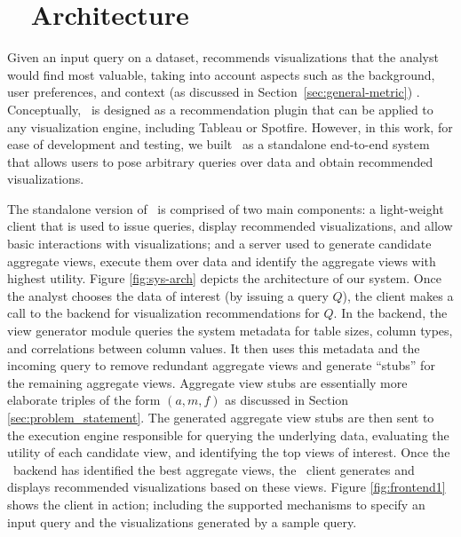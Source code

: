 

\section{{\large \SeeDB\ } Architecture}
\label{sec:system_architecture}

Given an input query on a dataset, 
\SeeDB recommends visualizations that the analyst would find most valuable,
taking into account aspects such as the background, user preferences,
and context (as discussed in Section~\ref{sec:general-metric}) .
Conceptually, \SeeDB\ is designed as a recommendation plugin that can
be applied to any visualization engine,
including Tableau or Spotfire. 
However, in this work, for ease of development and testing, we built 
\SeeDB\ as a standalone end-to-end system that allows users to pose 
arbitrary queries over data and obtain recommended visualizations.

The standalone version of \SeeDB\ is comprised of two main components: 
a light-weight client that is 
used to issue queries, display recommended visualizations, and allow basic 
interactions with visualizations; and a server used to generate candidate
aggregate views, execute
them over data and identify the aggregate views with highest utility. 
Figure \ref{fig:sys-arch} depicts the architecture of our system.
Once the analyst chooses the data of interest (by issuing a query $Q$), the
client makes a call to the backend for visualization recommendations for $Q$.
In the backend, the view generator module queries the system metadata for table sizes, 
column types, and correlations between column values. 
It then uses this metadata and the incoming query to remove redundant aggregate views and generate ``stubs'' for the remaining aggregate views. 
Aggregate view stubs are essentially more elaborate triples of the form $(a, m, f)$ as
discussed in Section \ref{sec:problem_statement}. 
The generated aggregate view stubs are then sent to the execution engine
responsible for querying the underlying data, evaluating the utility of each
candidate view, and identifying the top views of interest. 
Once the \SeeDB\ backend has identified the best aggregate views, the \SeeDB\
client generates and displays recommended visualizations based on these views.
Figure \ref{fig:frontend1} shows the \SeeDB client in action; including the supported mechanisms to specify an input query 
and the visualizations generated by a sample query. 

